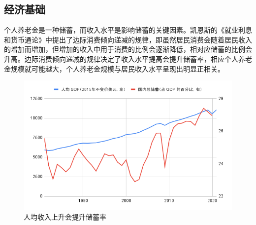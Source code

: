 \documentclass[a4paper,10.5pt]{ctexart}
\begin{document}
\subsection{经济基础}

个人养老金是一种储蓄，而收入水平是影响储蓄的关键因素。凯恩斯的《就业利息和货币通论》中提出了边际消费倾向递减的规律，即虽然居民消费会随着居民收入的增加而增加，但增加的收入中用于消费的比例会逐渐降低，相对应储蓄的比例会升高。边际消费倾向递减的规律决定了收入水平提高会提升储蓄率，相应个人养老金规模就可能越大，个人养老金规模与居民收入水平呈现出明显正相关。
\begin{figure}[H]
    \includegraphics[width=\linewidth]{img/人均收入上升会提升储蓄率.png}
    \caption{人均收入上升会提升储蓄率}
\end{figure}
\end{document}
